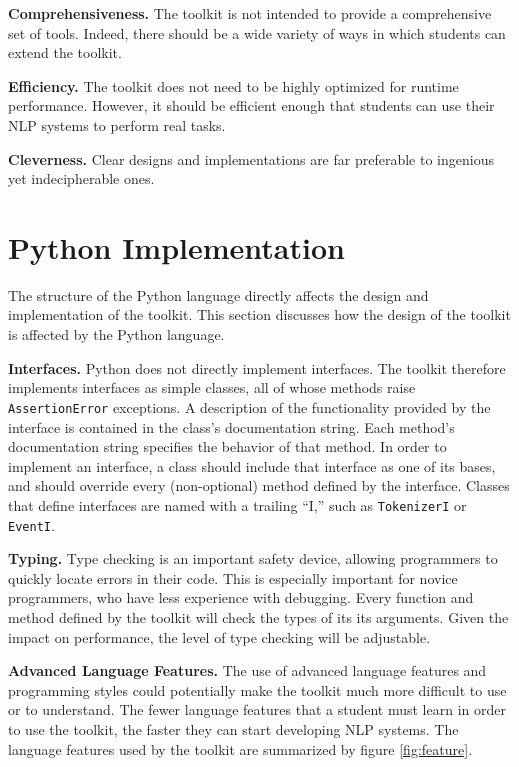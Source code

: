 \documentclass[11pt]{article}
\begin{document}
\textbf{Comprehensiveness.} The toolkit is not intended to provide a
comprehensive set of tools.  Indeed, there should be a wide variety of 
ways in which students can extend the toolkit.

\textbf{Efficiency.} The toolkit does not need to be highly optimized for
runtime performance.  However, it should be efficient enough that
students can use their NLP systems to perform real tasks.

\textbf{Cleverness.} Clear designs and implementations are far preferable 
to ingenious yet indecipherable ones.

\section{Python Implementation}

The structure of the Python language directly affects the design and
implementation of the toolkit.  This section discusses how the design
of the toolkit is affected by the Python language.

\textbf{Interfaces.}
Python does not directly implement interfaces.  The toolkit
therefore implements interfaces as simple classes, all of whose methods 
raise \texttt{AssertionError} exceptions.  A description of the
functionality provided by the interface is contained in the
class's documentation string.  Each method's documentation string
specifies the behavior of that method.
In order to implement an interface, a class should include that
interface as one of its bases, and should override every
(non-optional) method defined by the interface.
Classes that define interfaces are named with a trailing ``I,'' such
as \texttt{TokenizerI} or \texttt{EventI}.

\textbf{Typing.}
Type checking is an important safety device, allowing programmers to
quickly locate errors in their code.  This is especially important for
novice programmers, who have less experience with debugging.  Every
function and method defined by the toolkit will check the types of its
its arguments.  Given the impact on performance, the level of type checking
will be adjustable.

\textbf{Advanced Language Features.}
The use of advanced language features and programming styles could
potentially make the toolkit much more difficult to use or to
understand.  The fewer language features that a student must learn in
order to use the toolkit, the faster they can start developing NLP
systems.  The language features used by
the toolkit are summarized by figure \ref{fig:feature}.
\end{document}

